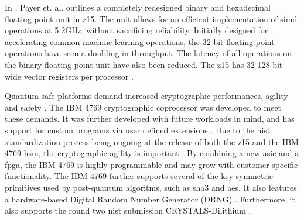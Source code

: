 In \cite{payer2020}, Payer et. al. outlines a completely redesigned binary and hexadecimal floating-point unit in \gls{z15}. The unit allows for an efficient implementation of \gls{simd} operations at 5.2GHz, without sacrificing reliability. Initially designed for accelerating common machine learning operations, the 32-bit floating-point operations have seen a doubling in throughput. The latency of all operations on the binary floating-point unit have also been reduced. The \gls{z15} has 32 128-bit wide vector registers per processor \cite{redbook:z15}.

Quantum-safe platforms demand increased cryptographic performances, agility and safety \cite{busby2020}. The IBM 4769 cryptographic coprocessor was developed to meet these demands. It was further developed with future workloads in mind, and has support for custom programs via user defined extensions \cite{busby2020, ibm:4769}. Due to the \gls{nist} standardization process being ongoing at the release of both the \gls{z15} and the IBM 4769 \gls{hsm}, the cryptographic agility is important \cite{microsoft2020, ibm:z15:2019}. By combining a new \gls{asic} and a \gls{fpga}, the IBM 4769 is highly programmable and may grow with customer-specific functionality. The IBM 4769 further supports several of the key symmetric primitives used by \gls{post-quantum} algoritms, such as \gls{sha3} and \gls{aes}. It also features a hardware-based Digital Random Number Generator (DRNG) \cite{ibm:4769:ep11}. Furthermore, it also supports the round two \gls{nist} submission CRYSTALS-Dilithium \cite{ibm:4769:ep11, busby2020}.


